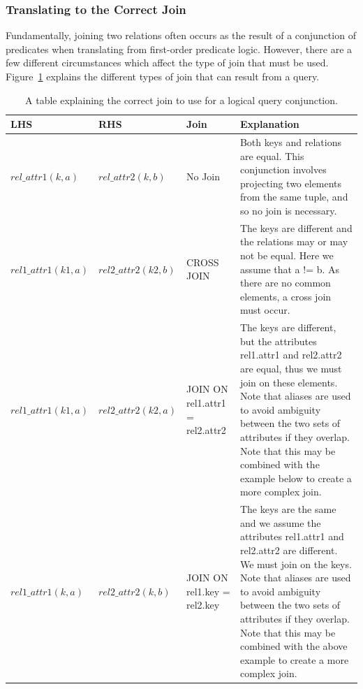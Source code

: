 \documentclass[a4paper, 11pt]{article}
\begin{document}
    \subsubsection{Translating to the Correct Join}

      Fundamentally, joining two relations often occurs as the result of a
      conjunction of predicates when translating from first-order predicate
      logic. However, there are a few different circumstances which affect the
      type of join that must be used. Figure~\ref{fig:jointranslation} explains
      the different types of join that can result from a query.

      \begin{table}
        \label{fig:jointranslation}
        \begin{tabular}{ | p{} |
          p{} |
          p{} |
          p{} | } \hline
        LHS & RHS & Join & Explanation \\
        \hline
        $rel\_attr1(k, a)$ & $rel\_attr2(k, b)$ & No Join & 
        Both keys and relations are equal. This conjunction involves projecting
        two elements from the same tuple, and so no join is necessary.\\ \hline
        $rel1\_attr1(k1, a)$ & $rel2\_attr2(k2, b)$ & CROSS JOIN &
        The keys are different and the relations may or may not be equal. Here
        we assume that a != b. As there are no common elements, a cross join
        must occur.\\ \hline
        $rel1\_attr1(k1, a)$ & $rel2\_attr2(k2, a)$ & JOIN ON rel1.attr1 =
        rel2.attr2 &
        The keys are different, but the attributes rel1.attr1 and rel2.attr2
        are equal, thus we must join on these elements. Note that aliases are
        used to avoid ambiguity between the two sets of attributes if they
        overlap. Note that this may be combined with the example below to
        create a more complex join.\\ \hline
        $rel1\_attr1(k, a)$ & $rel2\_attr2(k, b)$ & JOIN ON rel1.key =
        rel2.key &
        The keys are the same and we assume the attributes rel1.attr1 and rel2.attr2
        are different. We must join on the keys. Note that aliases are
        used to avoid ambiguity between the two sets of attributes if they
        overlap. Note that this may be combined with the above example to
        create a more complex join.\\ \hline
      \end{tabular}
        \caption{A table explaining the correct join to use for a logical query
        conjunction.}
    \end{table}
\end{document}
